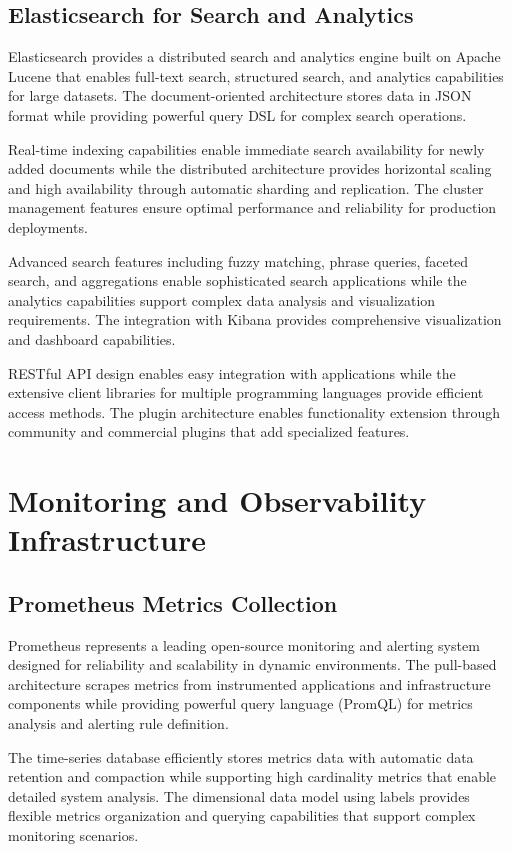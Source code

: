 \subsection{Elasticsearch for Search and Analytics}

Elasticsearch provides a distributed search and analytics engine built on Apache Lucene that enables full-text search, structured search, and analytics capabilities for large datasets. The document-oriented architecture stores data in JSON format while providing powerful query DSL for complex search operations.

Real-time indexing capabilities enable immediate search availability for newly added documents while the distributed architecture provides horizontal scaling and high availability through automatic sharding and replication. The cluster management features ensure optimal performance and reliability for production deployments.

Advanced search features including fuzzy matching, phrase queries, faceted search, and aggregations enable sophisticated search applications while the analytics capabilities support complex data analysis and visualization requirements. The integration with Kibana provides comprehensive visualization and dashboard capabilities.

RESTful API design enables easy integration with applications while the extensive client libraries for multiple programming languages provide efficient access methods. The plugin architecture enables functionality extension through community and commercial plugins that add specialized features.

\section{Monitoring and Observability Infrastructure}

\subsection{Prometheus Metrics Collection}

Prometheus represents a leading open-source monitoring and alerting system designed for reliability and scalability in dynamic environments. The pull-based architecture scrapes metrics from instrumented applications and infrastructure components while providing powerful query language (PromQL) for metrics analysis and alerting rule definition.

The time-series database efficiently stores metrics data with automatic data retention and compaction while supporting high cardinality metrics that enable detailed system analysis. The dimensional data model using labels provides flexible metrics organization and querying capabilities that support complex monitoring scenarios.

